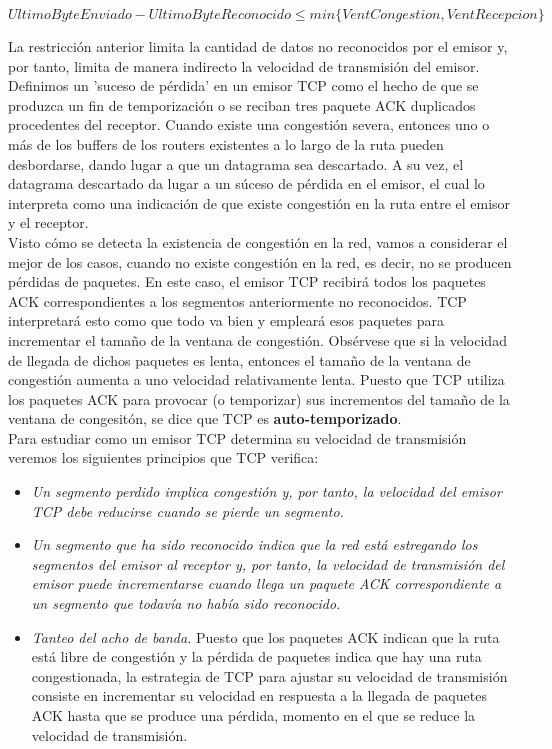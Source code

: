 \documentclass[a4paper,11pt]{article}
\begin{document}
\begin{equation*}
UltimoByteEnviado-UltimoByteReconocido \leq min\{VentCongestion, VentRecepcion\}
\end{equation*}

La restricción anterior limita la cantidad de datos no reconocidos por el emisor y, por tanto, limita de manera indirecto la velocidad de transmisión del emisor.  Definimos un 'suceso de pérdida' en un emisor TCP como el hecho de que se produzca un fin de temporización o se reciban tres paquete ACK duplicados procedentes del receptor. Cuando existe una congestión severa, entonces uno o más de los buffers de los routers existentes a lo largo de la ruta pueden desbordarse, dando lugar a que un datagrama sea descartado. A su vez, el datagrama descartado da lugar a un súceso de pérdida en el emisor, el cual lo interpreta como una indicación de que existe congestión en la ruta entre el emisor y el receptor. \\

Visto cómo se detecta la existencia de congestión en la red, vamos a considerar el mejor de los casos, cuando no existe congestión en la red, es decir, no se producen pérdidas de paquetes. En este caso, el emisor TCP recibirá todos los paquetes ACK correspondientes a los segmentos anteriormente no reconocidos. TCP interpretará esto como que todo va bien y empleará esos paquetes para incrementar el tamaño de la ventana de congestión. Obsérvese que si la velocidad de llegada de dichos paquetes es lenta, entonces el tamaño de la ventana de congestión aumenta a uno velocidad relativamente lenta. Puesto que TCP utiliza los paquetes ACK para provocar (o temporizar) sus incrementos del tamaño de la ventana de congesitón, se dice que TCP es \textbf{auto-temporizado}. \\

Para estudiar como un emisor TCP determina su velocidad de transmisión veremos los siguientes principios que TCP verifica:

\begin{itemize}
\item \textit{Un segmento perdido implica congestión y, por tanto, la velocidad del emisor TCP debe reducirse cuando se pierde un segmento.} 

\item \textit{Un segmento que ha sido reconocido indica que la red está estregando los segmentos del emisor al receptor y, por tanto, la velocidad de transmisión del emisor puede incrementarse cuando llega un paquete ACK correspondiente a un segmento que todavía no había sido reconocido.}

\item \textit{Tanteo del acho de banda.} Puesto que los paquetes ACK indican que la ruta está libre de congestión y la pérdida de paquetes indica que hay una ruta congestionada, la estrategia de TCP para ajustar su velocidad de transmisión consiste en incrementar su velocidad en respuesta a la llegada de paquetes ACK hasta que se produce una pérdida, momento en el que se reduce la velocidad de transmisión.
\end{itemize}
\end{document}
